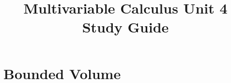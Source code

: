 \documentclass{article}
\title{Multivariable Calculus Unit 4 Study Guide}
\author{}
\date{}
\begin{document}
\maketitle

\section{Bounded Volume}
\end{document}
